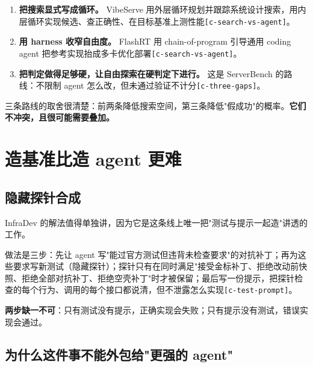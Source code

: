 \begin{enumerate}
  \item \textbf{把搜索显式写成循环。} VibeServe 用外层循环规划并跟踪系统设计搜索，用内层循环实现候选、查正确性、在目标基准上测性能{\scriptsize\texttt{[c-\hspace{0pt}search-\hspace{0pt}vs-\hspace{0pt}agent]}}。
  \item \textbf{用 harness 收窄自由度。} FlashRT 用 chain-of-program 引导通用 coding agent 把参考实现抬成多卡优化部署{\scriptsize\texttt{[c-\hspace{0pt}search-\hspace{0pt}vs-\hspace{0pt}agent]}}。
  \item \textbf{把判定做得足够硬，让自由探索在硬判定下进行。} 这是 ServerBench 的路线：不限制 agent 怎么改，但未通过验证不计分{\scriptsize\texttt{[c-\hspace{0pt}three-\hspace{0pt}gaps]}}。
\end{enumerate}

三条路线的取舍很清楚：前两条降低搜索空间，第三条降低"假成功"的概率。\textbf{它们不冲突，且很可能需要叠加。}


\section{造基准比造 agent 更难}

\subsection{隐藏探针合成}

InfraDev 的解法值得单独讲，因为它是这条线上唯一把"测试与提示一起造"讲透的工作。


做法是三步：先让 agent 写"能过官方测试但违背未检查要求"的对抗补丁；再为这些要求写新测试（隐藏探针）；探针只有在同时满足"接受金标补丁、拒绝改动前快照、拒绝全部对抗补丁、拒绝空壳补丁"时才被保留；最后写一份提示，把探针检查的每个行为、调用的每个接口都说清，但不泄露怎么实现{\scriptsize\texttt{[c-\hspace{0pt}test-\hspace{0pt}prompt]}}。


\textbf{两步缺一不可}：只有测试没有提示，正确实现会失败；只有提示没有测试，错误实现会通过。


\subsection{为什么这件事不能外包给"更强的 agent"}

